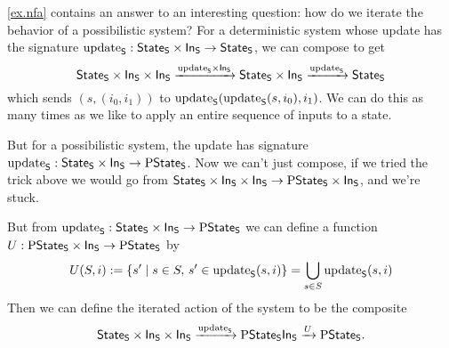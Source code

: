 \documentclass[DynamicalBook]{subfiles}
\begin{document}
\cref{ex.nfa} contains an answer to an interesting question: how do we iterate
the behavior of a possibilistic system? For a deterministic system whose update
has the signature $\update{S} : \State{S} \times \In{S} \to \State{S}$, we can
compose to get
$$\State{S} \times \In{S} \times \In{S} \xto{\update{S} \times \In{S}} \State{S}
\times \In{S} \xto{\update{S}} \State{S}$$
which sends $(s, (i_0, i_1))$ to $\update{S}(\update{S}(s, i_0), i_1)$. We can
do this as many times as we like to apply an entire sequence of inputs to a
state.

But for a possibilistic system, the update has signature $\update{S} :
\State{S} \times \In{S} \to \powset \State{S}$. Now we can't just compose, if we
tried the trick above we would go from $\State{S} \times \In{S} \times \In{S}
\to \powset\State{S} \times \In{S}$, and we're stuck.

But from $\update{S} : \State{S} \times \In{S} \to \powset\State{S}$ we can
define a function $U : \powset \State{S} \times \In{S} \to
\powset\State{S}$ by
\[
U(S, i) := \{s' \mid s \in S,\, s' \in \update{S}(s, i)\} =
\bigcup_{s \in S} \update{S}(s, i)
\]
Then we can define the iterated action of the system to be the composite
$$\State{S} \times \In{S} \times \In{S} \xto{\update{S}} \powset \State{S}
\In{S} \xto{U} \powset \State{S}.$$
\end{document}
